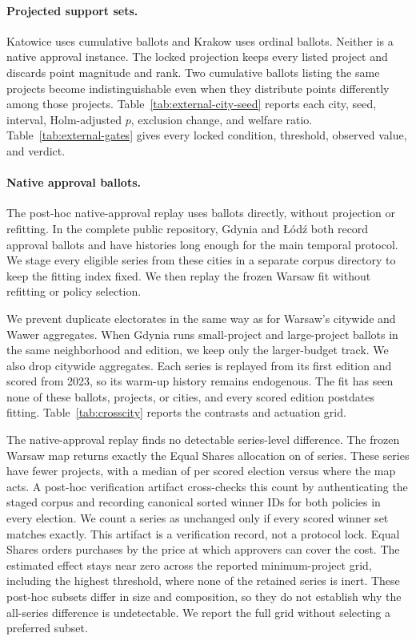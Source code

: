 \paragraph{Projected support sets.}
Katowice uses cumulative ballots and Krakow uses ordinal ballots. Neither is a
native approval instance. The locked projection keeps every listed project
and discards point magnitude and rank. Two cumulative ballots listing the same
projects become indistinguishable even when they distribute points differently
among those projects.
Table~\ref{tab:external-city-seed} reports each city, seed, interval,
Holm-adjusted $p$, exclusion change, and welfare ratio.
Table~\ref{tab:external-gates} gives every locked condition, threshold, observed
value, and verdict.

\paragraph{Native approval ballots.}
The post-hoc native-approval replay uses ballots directly, without projection
or refitting. In the complete public repository, Gdynia and \L{}\'od\'z both
record approval ballots and have histories long enough for the main temporal
protocol. We stage every eligible series from these cities in a separate
corpus directory to keep the fitting index fixed. We then replay the frozen
Warsaw fit without refitting or policy selection.

We prevent duplicate electorates in the same way as for Warsaw's citywide and
Wawer aggregates. When Gdynia runs small-project and large-project ballots in
the same neighborhood and edition, we keep only the larger-budget track. We
also drop citywide aggregates. Each series is replayed from its first edition
and scored from 2023, so its warm-up history remains endogenous. The fit has
seen none of these ballots, projects, or cities, and every scored edition
postdates fitting.
Table~\ref{tab:crosscity} reports the contrasts and actuation grid.

The native-approval replay finds no detectable series-level difference. The
frozen Warsaw map returns exactly the Equal Shares allocation on
\CrossCityInertN{} of \CrossCityAllSeriesN{} series. These series have fewer
projects, with a median of \CrossCityMedianProjectsInert{} per scored election
versus \CrossCityMedianProjectsActive{} where the map acts. A post-hoc
verification artifact cross-checks this count by authenticating the staged
corpus and recording canonical sorted winner IDs for both policies in every
election. We count a series as unchanged only if every scored winner set
matches exactly. This artifact is a verification record, not a protocol lock.
Equal Shares orders purchases by the price at which approvers can cover the
cost. The estimated effect stays near zero across the reported minimum-project
grid, including the highest threshold, where none of the retained series is
inert. These post-hoc subsets differ in size and composition, so they do not
establish why the all-series difference is undetectable. We report the full
grid without selecting a preferred subset.

